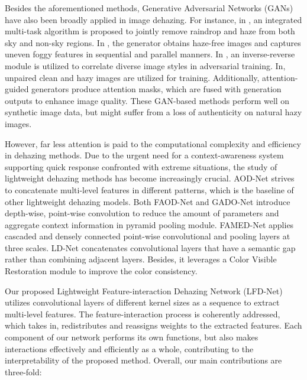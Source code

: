 \documentclass[lettersize,journal]{IEEEtran}
\begin{document}
Besides the aforementioned methods, Generative Adversarial Networks (GANs) have also been broadly applied in image dehazing. For instance, in \cite{guo2020joint}, an integrated multi-task algorithm is proposed to jointly remove raindrop and haze from both sky and non-sky regions. In \cite{li2020deep}, the generator obtains haze-free images and captures uneven foggy features in sequential and parallel manners. In \cite{ding2021perceptual}, an inverse-reverse module is utilized to correlate diverse image styles in adversarial training. In\cite{2019AttentionGAN}, unpaired clean and hazy images are utilized for training. Additionally, attention-guided generators produce attention masks, which are fused with generation outputs to enhance image quality. These GAN-based methods perform well on synthetic image data, but might suffer from a loss of authenticity on natural hazy images. 

However, far less attention is paid to the computational complexity and efficiency in dehazing methods. Due to the urgent need for a context-awareness system supporting quick response confronted with extreme situations, the study of lightweight dehazing methods has become increasingly crucial. AOD-Net\cite{li2017aod} strives to concatenate multi-level features in different patterns, which is the baseline of other lightweight dehazing models. Both FAOD-Net\cite{2020FAOD} and GADO-Net\cite{GAOD} introduce depth-wise, point-wise convolution to reduce the amount of parameters and aggregate context information in pyramid pooling module. FAMED-Net\cite{2020FAMED} applies cascaded and densely connected point-wise convolutional and pooling layers at three scales. LD-Net\cite{ullah2021light} concatenates convolutional layers that have a semantic gap rather than combining adjacent layers. Besides, it leverages a Color Visible Restoration module to improve the color consistency. 


Our proposed Lightweight Feature-interaction Dehazing Network (LFD-Net) utilizes convolutional layers of different kernel sizes as a sequence to extract multi-level features. The feature-interaction process is coherently addressed, which takes in, redistributes and reassigns weights to the extracted features. Each component of our network performs its own functions, but also makes interactions effectively and efficiently as a whole, contributing to the interpretability of the proposed method. Overall, our main contributions are three-fold:
\end{document}
